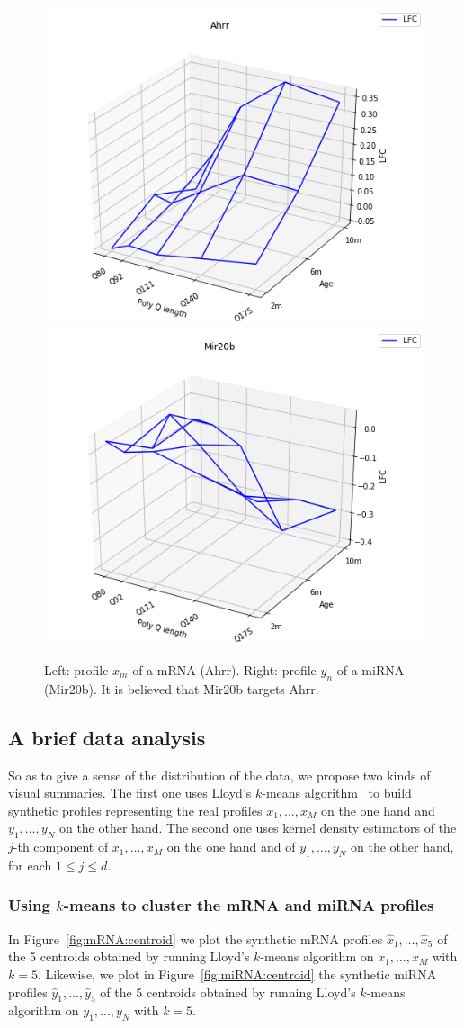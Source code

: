 \begin{figure}
  \centering %
  \includegraphics[width=0.45\linewidth]{images/Ahrr.png}%
  \qquad%
  \includegraphics[width=0.45\linewidth]{images/Mir20b.png}
  \caption{Left: profile $x_{m}$ of a  mRNA (Ahrr).  Right: profile $y_{n}$ of
    a miRNA (Mir20b).  It is believed that Mir20b targets Ahrr.}
  \label{fig:Mir20b}
\end{figure}

\subsection{A brief data analysis}

So as  to give a sense  of the distribution  of the data, we  propose two
  kinds  of   visual  summaries.   The   first  one  uses   Lloyd's  $k$-means
  algorithm~\citep{Lloyd1982}  to build  synthetic  profiles representing  the
  real   profiles   $x_{1},    \ldots,   x_{M}$   on   the    one   hand   and
  $y_{1}, \ldots, y_{N}$ on the other hand. The second one uses kernel density
  estimators of the $j$-th component of $x_{1}, \ldots, x_{M}$ on the one hand
  and of $y_{1}, \ldots, y_{N}$ on the other hand, for each $1\leq j \leq d$.

\subsubsection{Using $k$-means to  cluster the mRNA and miRNA
    profiles}
\label{subsec:k:means}

In  Figure~\ref{fig:mRNA:centroid} we  plot the  synthetic mRNA  profiles
  $\hat{x}_{1}, \ldots,  \hat{x}_{5}$ of the  5 centroids obtained  by running
  Lloyd's $k$-means algorithm on $x_{1}, \ldots, x_{M}$ with $k=5$.  Likewise,
  we  plot in  Figure~\ref{fig:miRNA:centroid}  the  synthetic miRNA  profiles
  $\hat{y}_{1}, \ldots,  \hat{y}_{5}$ of the  5 centroids obtained  by running
  Lloyd's $k$-means algorithm on $y_{1}, \ldots, y_{N}$ with $k=5$.

